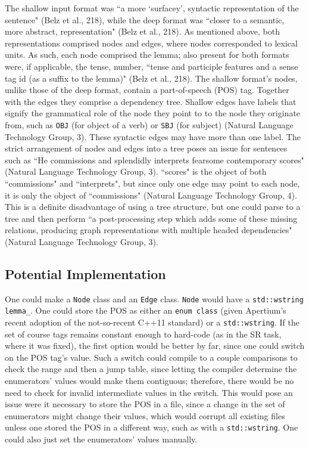 \documentclass[12pt,letterpaper]{article}
\begin{document}
\begin{flushleft}
  The shallow input format was ``a more `surfacey', syntactic representation of the sentence" (Belz et al., 218), while the deep format was ``closer to a semantic, more abstract, representation" (Belz et al., 218). As mentioned above, both representations comprised nodes and edges, where nodes corresponded to lexical units. As such, each node comprised the lemma; also present for both formats were, if applicable, the tense, number, ``tense and participle features and a sense tag id (as a suffix to the lemma)" (Belz et al., 218). %
  The shallow format's nodes, unlike those of the deep format, contain a part-of-speech (POS) tag. Together with the edges they comprise a dependency tree. Shallow edges have labels that signify the grammatical role of the node they point to to the node they originate from, such as \texttt{OBJ} (for object of a verb) or \texttt{SBJ} (for subject) (Natural Language Technology Group, 3). These syntactic edges may have more than one label. The strict arrangement of nodes and edges into a tree poses an issue for sentences such as ``He commissions and splendidly interprets fearsome contemporary scores" (Natural Language Technology Group, 3). ``scores" is the object of both ``commissions" and ``interprets", but since only one edge may point to each node, it is only the object of ``commissions" (Natural Language Technology Group, 4). This is a definite disadvantage of using a tree structure, but one could parse to a tree and then perform ``a post-processing step which adds some of these missing relations, producing graph representations with multiple headed dependencies" (Natural Language Technology Group, 3).
  \subsection*{Potential Implementation} One could make a \texttt{Node} class and an \texttt{Edge} class. \texttt{Node} would have a \texttt{std::wstring lemma\_}. One could store the POS as either an \texttt{enum class} (given Apertium's recent adoption of the not-so-recent C++11 standard) or a \texttt{std::wstring}. If the set of course tags remains constant enough to hard-code (as in the SR task, where it was fixed), the first option would be better by far, since one could switch on the POS tag's value. Such a switch could compile to a couple comparisons to check the range and then a jump table, since letting the compiler determine the enumerators' values would make them contiguous; therefore, there would be no need to check for invalid intermediate values in the switch. This would pose an issue were it necessary to store the POS in a file, since a change in the set of enumerators might change their values, which would corrupt all existing files unless one stored the POS in a different way, such as with a \texttt{std::wstring}. One could also just set the enumerators' values manually.


\end{flushleft}
\end{document}

